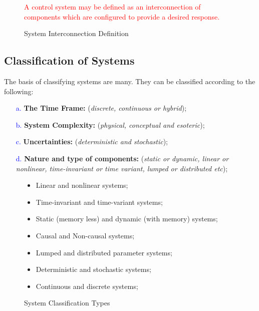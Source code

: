 \documentclass[a4paper,12pt]{report}
\begin{document}
\vspace{-1em}
\begin{figure}[H]
    \centering
    \begin{mdframed}
        \begin{center}
            \textcolor{red}{%
                A control system may be defined as an interconnection of components which are configured to provide a desired response.}
        \end{center}
    \end{mdframed}\label{fig:system-interconnect-def-1}
    \vspace{-1em}\caption{System Interconnection Definition}
\end{figure}
\subsection{Classification of Systems}
The basis of classifying systems are many. They can be classified according to the following:
\begin{itemize}
    \item[\textcolor{blue}{a.}] \textbf{The Time Frame:} (\emph{discrete, continuous or hybrid});
    \item[\textcolor{blue}{b.}] \textbf{System Complexity:} (\emph{physical, conceptual and esoteric});
    \item[\textcolor{blue}{c.}] \textbf{Uncertainties:} (\emph{deterministic and stochastic});
    \item[\textcolor{blue}{d.}] \textbf{Nature and type of components:} (\emph{static or dynamic, linear or nonlinear, time-invariant or time variant, lumped or distributed etc});
\end{itemize}
\begin{figure}[H]
    \centering
    \begin{mdframed}
        \begin{itemize}
            \item Linear and nonlinear systems;
            \item Time-invariant and time-variant systems;
            \item Static (memory less) and dynamic (with memory) systems;
            \item Causal and Non-causal systems;
            \item Lumped and distributed parameter systems;
            \item Deterministic and stochastic systems;
            \item Continuous and discrete systems;
        \end{itemize}
    \end{mdframed}\label{fig:system-type-list-1}
    \vspace{-1em}\caption{System Classification Types}
\end{figure}
\vspace{-1em}
\end{document}
